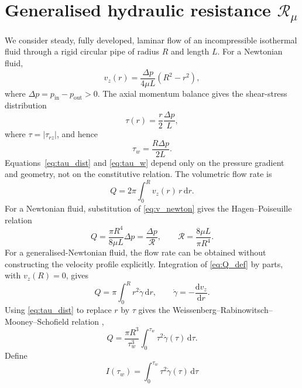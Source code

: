 \documentclass[lineno]{jfm}
\begin{document}
\section{Generalised hydraulic resistance
\texorpdfstring{$\mathcal{R}_{\mu}$}{Rmu}}
\label{sec:Rmu}
We consider steady, fully developed, laminar flow of an incompressible
isothermal fluid through a rigid circular pipe of radius $R$ and length $L$.
For a Newtonian fluid,
\begin{equation}
v_z(r)
=
\frac{\Delta p}{4\mu L}
\left(R^2-r^2\right),
\label{eq:v_newton}
\end{equation}
where
$\Delta p=p_{\mathrm{in}}-p_{\mathrm{out}}>0$.
The axial momentum balance gives the shear-stress distribution
\begin{equation}
\tau(r)
=
\frac{r}{2}\frac{\Delta p}{L},
\label{eq:tau_dist}
\end{equation}
where $\tau=|\tau_{rz}|$, and hence
\begin{equation}
\tau_w
=
\frac{R\Delta p}{2L}.
\label{eq:tau_w}
\end{equation}
Equations~\eqref{eq:tau_dist} and \eqref{eq:tau_w} depend only on the pressure
gradient and geometry, not on the constitutive relation.
The volumetric flow rate is
\begin{equation}
Q
=
2\pi\int_0^R v_z(r)\,r\,\mathrm{d}r.
\label{eq:Q_def}
\end{equation}
For a Newtonian fluid, substitution of \eqref{eq:v_newton} gives the
Hagen--Poiseuille relation
\begin{equation}
Q
=
\frac{\pi R^4}{8\mu L}\Delta p
=
\frac{\Delta p}{\mathcal{R}},
\qquad
\mathcal{R}
=
\frac{8\mu L}{\pi R^4}.
\label{eq:poiseuille}
\end{equation}
For a generalised-Newtonian fluid, the flow rate can be obtained without
constructing the velocity profile explicitly. Integration of
\eqref{eq:Q_def} by parts, with $v_z(R)=0$, gives
\begin{equation}
Q
=
\pi\int_0^R r^2\dot{\gamma}\,\mathrm{d}r,
\qquad
\dot{\gamma}
=
-\frac{\mathrm{d}v_z}{\mathrm{d}r}.
\label{eq:Q_byparts}
\end{equation}
Using \eqref{eq:tau_dist} to replace $r$ by $\tau$ gives the
Weissenberg--Rabinowitsch--Mooney--Schofield relation
\citep{Rabinowitsch1929,Bird1987},
\begin{equation}
Q
=
\frac{\pi R^3}{\tau_w^3}
\int_0^{\tau_w}
\tau^2\dot{\gamma}(\tau)\,\mathrm{d}\tau.
\label{eq:WRMS_general}
\end{equation}
Define
\begin{equation}
I(\tau_w)
=
\int_0^{\tau_w}
\tau^2\dot{\gamma}(\tau)\,\mathrm{d}\tau
\label{eq:rheological_integral}
\end{equation}
\end{document}
